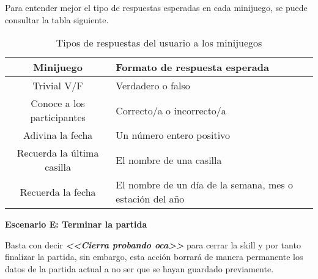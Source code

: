 Para entender mejor el tipo de respuestas esperadas en cada minijuego, se puede consultar la tabla siguiente.
\begin{table}[H]
	\centering
	\begin{tabular}{|c|p{7cm}|}
		\hline
		\rowcolor{lightgray}
		\textbf{Minijuego} & \textbf{Formato de respuesta esperada}\\
		\hline
		Trivial V/F & Verdadero o falso \\
		\hline
		Conoce a los participantes & Correcto/a o incorrecto/a \\
		\hline
		Adivina la fecha & Un número entero positivo \\
		\hline
		Recuerda la última casilla & El nombre de una casilla \\
		\hline
		Recuerda la fecha & El nombre de un día de la semana, mes o estación del año \\
		\hline
	\end{tabular}
	\caption{Tipos de respuestas del usuario a los minijuegos}
	\label{tab:respuestas-minijuegos}
\end{table}

\textbf{Escenario E: Terminar la partida}

Basta con decir \textbf{\textit{<<Cierra probando oca>>}} para cerrar la skill y por tanto finalizar la partida, sin embargo, esta acción borrará de manera permanente los datos de la partida actual a no ser que se hayan guardado previamente.


